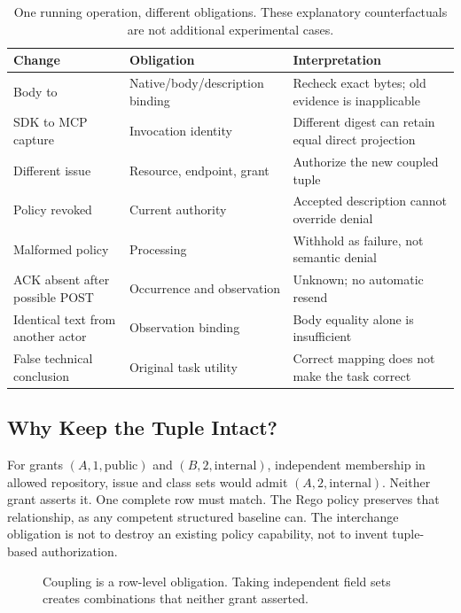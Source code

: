 \documentclass[11pt,letterpaper]{article}
\newcommand{\code}[1]{\texttt{\detokenize{#1}}}
\begin{document}
\begin{table}[tbp]
\centering\small
\begin{tabular}{@{}L{.27\linewidth}L{.29\linewidth}L{.37\linewidth}@{}}
\toprule
Change & Obligation & Interpretation \\
\midrule
Body \code{abc} to \code{abd} & Native/body/description binding & Recheck exact bytes; old evidence is inapplicable \\
SDK to MCP capture & Invocation identity & Different digest can retain equal direct projection \\
Different issue & Resource, endpoint, grant & Authorize the new coupled tuple \\
Policy revoked & Current authority & Accepted description cannot override denial \\
Malformed policy & Processing & Withhold as failure, not semantic denial \\
ACK absent after possible POST & Occurrence and observation & Unknown; no automatic resend \\
Identical text from another actor & Observation binding & Body equality alone is insufficient \\
False technical conclusion & Original task utility & Correct mapping does not make the task correct \\
\bottomrule
\end{tabular}
\caption{One running operation, different obligations. These explanatory
counterfactuals are not additional experimental cases.}
\label{tab:running}
\end{table}

\subsection{Why Keep the Tuple Intact?}

For grants $(A,1,\mathrm{public})$ and $(B,2,\mathrm{internal})$, independent
membership in allowed repository, issue and class sets would admit
$(A,2,\mathrm{internal})$. Neither grant asserts it. One complete row must match.
The Rego policy preserves that relationship, as any competent structured
baseline can. The interchange obligation is not to destroy an existing policy
capability, not to invent tuple-based authorization.

\begin{figure}[tbp]
\centering
{}
\caption{Coupling is a row-level obligation. Taking independent field sets
creates combinations that neither grant asserted.}
\label{fig:coupling}
\end{figure}
\end{document}
